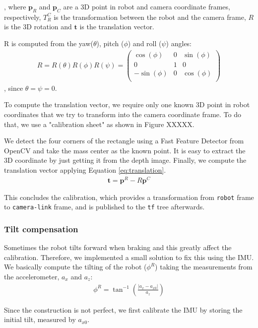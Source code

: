 , where $\textbf{p}_R$ and $\textbf{p}_C$ are a 3D point in robot and camera coordinate frames, respectively, $T_R^C$ is the transformation between the robot and the camera frame, $R$ is the 3D rotation and $\textbf{t}$ is the translation vector. 

R is computed from the yaw($\theta$), pitch ($\phi$) and roll ($\psi$) angles:
\begin{align}
R = R(\theta) R(\phi) R(\psi) = 
\begin{pmatrix}
\cos(\phi) & 0 & \sin(\phi) \\
0 & 1 & 0 \\
-\sin(\phi) & 0 & \cos(\phi) \\
\end{pmatrix}
\end{align}
, since $\theta = \psi = 0$.

To compute the translation vector, we require only one known 3D point in robot coordinates that we try to transform into the camera coordinate frame. To do that, we use a "calibration sheet" as shown in Figure XXXXX.


We detect the four corners of the rectangle using a Fast Feature Detector from OpenCV and take the mass center as the known point. It is easy to extract the 3D coordinate by just getting it from the depth image. 
Finally, we compute the translation vector applying Equation \ref{eq:translation}.
\begin{align}
\label{eq:translation}
\textbf{t} = \textbf{p}^R - R \textbf{p}^C
\end{align}

This concludes the calibration, which provides a transformation from \texttt{robot} frame to \texttt{camera-link} frame, and is published to the \texttt{tf} tree afterwards. 

\subsubsection{Tilt compensation}
Sometimes the robot tilts forward when braking and this greatly affect the calibration. Therefore, we implemented a small solution to fix this using the IMU. We basically compute the tilting of the robot ($\phi^R$) taking the measurements from the accelerometer, $a_x$ and $a_z$:
\begin{align}
\phi^R = \tan^{-1} \left(\frac{|a_x - a_{x0}|}{a_z}\right)
\end{align}

Since the construction is not perfect, we first calibrate the IMU by storing the initial tilt, measured by $a_{x0}$. 

